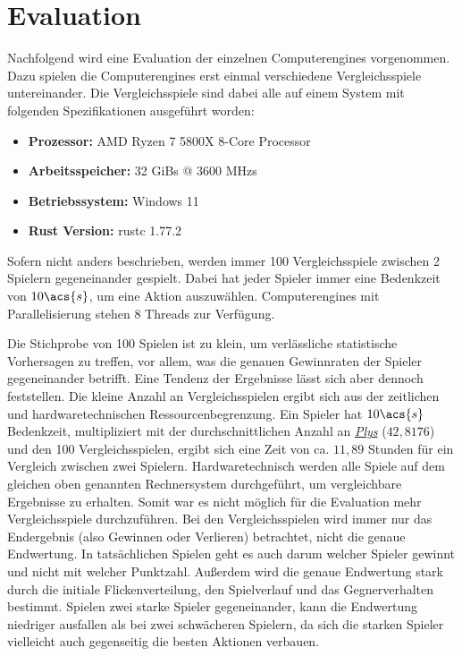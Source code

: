 \chapter{Evaluation}
\label{chapter:evaluation}


Nachfolgend wird eine Evaluation der einzelnen Computerengines vorgenommen. Dazu spielen die Computerengines erst einmal verschiedene Vergleichsspiele untereinander. Die Vergleichsspiele sind dabei alle auf einem System mit folgenden Spezifikationen ausgeführt worden:

\begin{itemize}
    \item \vspace{-0.15cm} \textbf{Prozessor:} \ac{AMD} Ryzen 7 5800X 8-Core Processor
    \item \vspace{-0.15cm} \textbf{Arbeitsspeicher:} 32 \acsp{GiB} @ 3600 \acsp{MHz}
    \item \vspace{-0.15cm} \textbf{Betriebssystem:} Windows 11
    \item \vspace{-0.15cm} \textbf{Rust Version:} rustc 1.77.2
\end{itemize}

Sofern nicht anders beschrieben, werden immer 100 Vergleichsspiele zwischen 2 Spielern gegeneinander gespielt. Dabei hat jeder Spieler immer eine Bedenkzeit von $10\acs{s}$, um eine Aktion auszuwählen. Computerengines mit Parallelisierung stehen 8 Threads zur Verfügung.

Die Stichprobe von 100 Spielen ist zu klein, um verlässliche statistische Vorhersagen zu treffen, vor allem, was die genauen Gewinnraten der Spieler gegeneinander betrifft. Eine Tendenz der Ergebnisse lässt sich aber dennoch feststellen. Die kleine Anzahl an Vergleichsspielen ergibt sich aus der zeitlichen und hardwaretechnischen Ressourcenbegrenzung. Ein Spieler hat $10\acs{s}$ Bedenkzeit, multipliziert mit der durchschnittlichen Anzahl an \hyperref[text:ply]{\emph{Plys}} ($42{,}8176$) und den 100 Vergleichsspielen, ergibt sich eine Zeit von ca. $11,89$ Stunden für ein Vergleich zwischen zwei Spielern. Hardwaretechnisch werden alle Spiele auf dem gleichen oben genannten Rechnersystem durchgeführt, um vergleichbare Ergebnisse zu erhalten. Somit war es nicht möglich für die Evaluation mehr Vergleichsspiele durchzuführen. Bei den Vergleichsspielen wird immer nur das Endergebnis (also Gewinnen oder Verlieren) betrachtet, nicht die genaue Endwertung. In tatsächlichen Spielen geht es auch darum welcher Spieler gewinnt und nicht mit welcher Punktzahl. Außerdem wird die genaue Endwertung stark durch die initiale Flickenverteilung, den Spielverlauf und das Gegnerverhalten bestimmt. Spielen zwei starke Spieler gegeneinander, kann die Endwertung niedriger ausfallen als bei zwei schwächeren Spielern, da sich die starken Spieler vielleicht auch gegenseitig die besten Aktionen verbauen.


